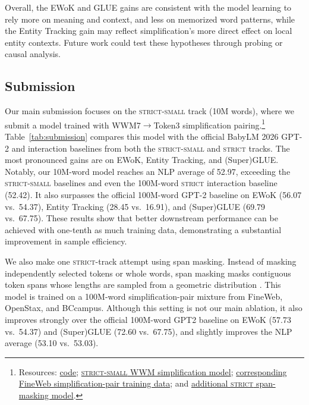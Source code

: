 \documentclass[11pt]{article}
\begin{document}
Overall, the EWoK and GLUE gains are consistent with the model learning to rely more on meaning and context, and less on memorized word patterns, while the Entity Tracking gain may reflect simplification's more direct effect on local entity contexts. Future work could test these hypotheses through probing or causal analysis.

\subsection{Submission}
\label{sec:submission}

Our main submission focuses on the \textsc{strict-small} track (10M words), where we submit a model trained with WWM7$\to$Token3 simplification pairing.\footnote{Resources: \href{https://github.com/chuanshi31/baby26_rewrite_pairing}{code}; \href{https://huggingface.co/go76dof/wwm_curriculum_simplification_40k}{\textsc{strict-small} WWM simplification model}; \href{https://huggingface.co/datasets/go76dof/Fineweb_simplification_pairs}{corresponding FineWeb simplification-pair training data}; and \href{https://huggingface.co/go76dof/spangeo05_simplification}{additional \textsc{strict} span-masking model}.} Table~\ref{tab:submission} compares this model with the official BabyLM 2026 GPT-2 and interaction baselines \citep{babylm2026eval} from both the \textsc{strict-small} and \textsc{strict} tracks. The most pronounced gains are on EWoK, Entity Tracking, and (Super)GLUE. Notably, our 10M-word model reaches an NLP average of 52.97, exceeding the \textsc{strict-small} baselines and even the 100M-word \textsc{strict} interaction baseline (52.42). It also surpasses the official 100M-word GPT-2 baseline on EWoK (56.07 vs.\ 54.37), Entity Tracking (28.45 vs.\ 16.91), and (Super)GLUE (69.79 vs.\ 67.75). These results show that better downstream performance can be achieved with one-tenth as much training data, demonstrating a substantial improvement in sample efficiency.

We also make one \textsc{strict}-track attempt using span masking. Instead of masking independently selected tokens or whole words, span masking masks contiguous token spans whose lengths are sampled from a geometric distribution \citep{joshi2020spanbert}. This model is trained on a 100M-word simplification-pair mixture from FineWeb, OpenStax, and BCcampus. Although this setting is not our main ablation, it also improves strongly over the official 100M-word GPT2 baseline on EWoK (57.73 vs.\ 54.37) and (Super)GLUE (72.60 vs.\ 67.75), and slightly improves the NLP average (53.10 vs.\ 53.03).
\end{document}
